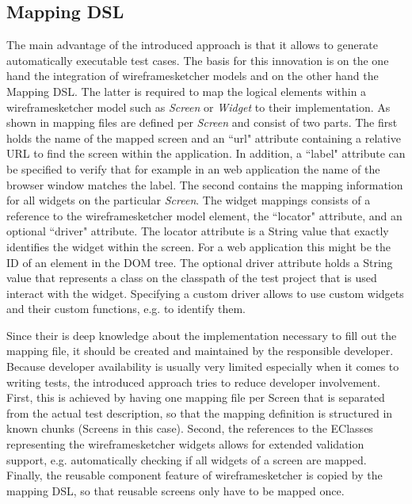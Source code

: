 \documentclass{sig-alternate-05-2015}
\begin{document}
{\subsection{Mapping DSL}
The main advantage of the introduced approach is that it allows to generate automatically executable test cases.
The basis for this innovation is on the one hand the integration of wireframesketcher models and on the other hand the Mapping DSL.
The latter is required to map the logical elements within a wireframesketcher model such as \textit{Screen} or \textit{Widget} to their implementation.
As shown in  mapping files are defined per \textit{Screen} and consist of two parts.
The first holds the name of the mapped screen and an ``url" attribute containing a relative URL to find the screen within the application.
In addition, a ``label" attribute can be specified to verify that for example in an web application the name of the browser window matches the label.
The second contains the mapping information for all widgets on the particular \textit{Screen}.
The widget mappings consists of a reference to the wireframesketcher model element, the ``locator" attribute, and an optional ``driver" attribute.
The locator attribute is a String value that exactly identifies the widget within the screen.
For a web application this might be the ID of an element in the DOM tree.
The optional driver attribute holds a String value that represents a class on the classpath of the test project that is used interact with the widget.
Specifying a custom driver allows to use custom widgets and their custom functions, e.g. to identify them.

Since their is deep knowledge about the implementation necessary to fill out the mapping file, it should be created and maintained by the responsible developer. 
Because developer availability is usually very limited especially when it comes to writing tests, the introduced approach tries to reduce developer involvement.
First, this is achieved by having one mapping file per Screen that is separated from the actual test description, so that the mapping definition is structured in known chunks (Screens in this case). 
Second, the references to the EClasses representing the wireframesketcher widgets allows for extended validation support, e.g. automatically checking if all widgets of a screen are mapped.
Finally, the reusable component feature of wireframesketcher is copied by the mapping DSL, so that reusable screens only have to be mapped once.

}
\end{document}
